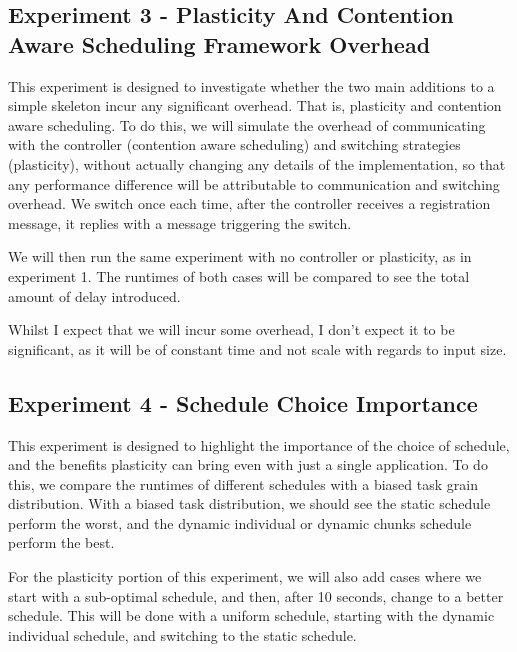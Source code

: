 



\subsection{Experiment 3 - Plasticity And Contention Aware Scheduling Framework Overhead}

This experiment is designed to investigate whether the two main additions to a simple skeleton incur any significant overhead. That is, plasticity and contention aware scheduling. To do this, we will simulate the overhead of communicating with the controller (contention aware scheduling) and switching strategies (plasticity), without actually changing any details of the implementation, so that any performance difference will be attributable to communication and switching overhead. We switch once each time, after the controller receives a registration message, it replies with a message triggering the switch.

We will then run the same experiment with no controller or plasticity, as in experiment 1. The runtimes of both cases will be compared to see the total amount of delay introduced.

Whilst I expect that we will incur some overhead, I don't expect it to be significant, as it will be of constant time and not scale with regards to input size.





\subsection{Experiment 4 - Schedule Choice Importance}

This experiment is designed to highlight the importance of the choice of schedule, and the benefits plasticity can bring even with just a single application. To do this, we compare the runtimes of different schedules with a biased task grain distribution. With a biased task distribution, we should see the static schedule perform the worst, and the dynamic individual or dynamic chunks schedule perform the best.

For the plasticity portion of this experiment, we will also add cases where we start with a sub-optimal schedule, and then, after 10 seconds, change to a better schedule. This will be done with a uniform schedule, starting with the dynamic individual schedule, and switching to the static schedule.

